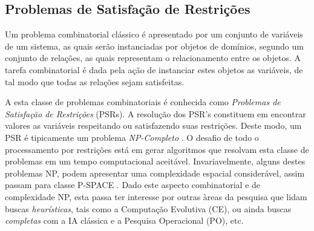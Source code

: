 \documentclass[12pt]{article}
\theoremstyle{definition}
\begin{document}
\subsection{Problemas de Satisfação de Restrições}
\label{sec:ch_cp}

Um problema combinatorial cl\'assico é apresentado por um conjunto de vari\'aveis de um sistema,  as quais  ser\~ao instanciadas por objetos de domínios, segundo um conjunto de relaç\~oes, as quais representam o relacionamento entre os objetos. A tarefa combinatorial
é dada pela aç\~ao de instanciar estes objetos as variáveis, de tal modo que todas as 
relaç\~oes sejam satisfeitas.

A esta classe de problemas combinatoriais é conhecida como \textit{Problemas de Satisfação de Restrições} (PSRs). A resoluç\~ao dos PSR's constituem em encontrar valores as variáveis
respeitando ou satisfazendo suas restrições. Deste modo, um PSR é tipicamente um problema \textit{NP-Completo} \cite{rossi2006}. O desafio de todo o processamento por restrições está em gerar algoritmos que resolvam esta classe de problemas em um tempo
computacional aceitável. Invariavelmente, alguns destes problemas NP, podem apresentar uma
complexidade espacial consider\'avel, assim passam para classe P-SPACE \cite{sipser_1996}.
Dado este aspecto combinatorial e de complexidade NP, esta passa ter interesse
por outras àreas da pesquisa que lidam buscas \textit{heurísticas}, tais como a Computação Evolutiva (CE),
 ou ainda buscas \textit{completas} com a IA clássica e a Pesquisa Operacional (PO), etc. 


\begin{comment}
Para esta classe de problemas lança-se mão do uso da \textit{Programação por Restrições} (PPR ou PR), ou seja, uma técnica que utiliza uma teoria e  ferramentas pr\'oprias de  programação. A PPR é uma forma de aplicar os conceitos de variáveis, domínios e restrições, via esta teoria específica de programação. 
\end{comment}


\begin{comment}
Esta situaçao é ilustrada pela figura \ref{fig:eureka}.
\begin{figure}[!ht]
\begin{center}
  \texttt{[image: figuras/psr\_01.eps]}
  \caption{Família dos problemas do tipo satisfação de restrições}
\label{fig:eureka}
\end{center}
\end{figure}
\end{comment}
\end{document}
